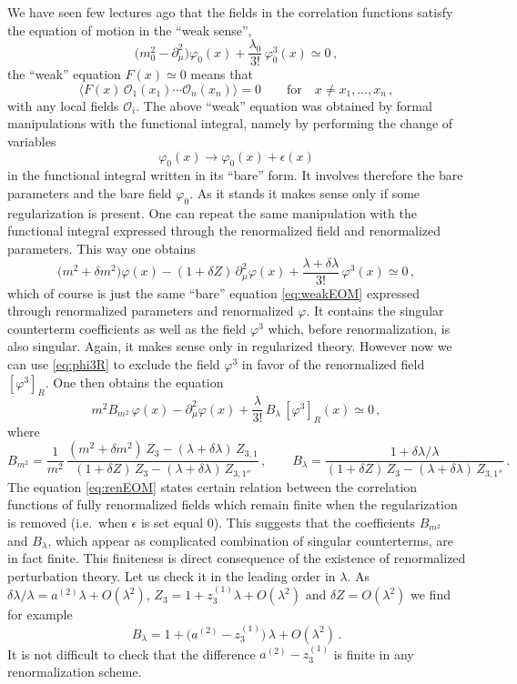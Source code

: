 We have seen few lectures ago that the fields in the correlation functions
satisfy the equation of motion in the ``weak sense'',
\begin{equation}\label{eq:weakEOM}
\bigl(m_0^2-\partial_\mu^2\bigr)\varphi_0(x)+\frac{\lambda_0}{3!}\,\varphi_0^3(x)\simeq0\,,
\end{equation}
the ``weak'' equation $F(x)\simeq0$ means that
\[
\bigl\langle F(x)\,\mathcal O_1(x_1)\cdots\mathcal O_n(x_n)\bigr\rangle=0\qquad\text{for}\quad x\neq x_1,\dots,x_n\,,
\]
with any local fields $\mathcal O_i$. The above ``weak'' equation was obtained by
formal manipulations with the functional integral, namely by performing the
change of variables
\[
\varphi_0(x)\to\varphi_0(x)+\epsilon(x)
\]
in the functional integral written in its ``bare'' form. It involves therefore
the bare parameters and the bare field $\varphi_0$. As it stands it makes sense
only if some regularization is present. One can repeat the same manipulation with
the functional integral expressed through the renormalized field and
renormalized parameters. This way one obtains
\[
\bigl(m^2+\delta m^2\bigr)\varphi(x)-(1+\delta Z)\,\partial_\mu^2\varphi(x)+\frac{\lambda+\delta\lambda}{3!}\,\varphi^3(x)\simeq0\,,
\]
which of course is just the same ``bare'' equation \eqref{eq:weakEOM} expressed
through renormalized parameters and renormalized $\varphi$. It contains the
singular counterterm coefficients as well as the field $\varphi^3$ which, before
renormalization, is also singular. Again, it makes sense only in regularized
theory. However now we can use \eqref{eq:phi3R} to exclude the field $\varphi^3$
in favor of the renormalized field $[\varphi^3]_R$. One then obtains the
equation
\begin{equation}\label{eq:renEOM}
m^2B_{m^2}\,\varphi(x)-\partial_\mu^2\varphi(x)+\frac\lambda{3!}\,B_\lambda\,[\varphi^3]_R(x)\simeq0\,,
\end{equation}
where
\[
B_{m^2}=\frac1{m^2}\,\frac{(m^2+\delta m^2)\,Z_3-(\lambda+\delta\lambda)\,Z_{3,1}}{(1+\delta Z)\,Z_3-(\lambda+\delta\lambda)\,Z_{3,1''}}\,,\qquad
B_\lambda=\frac{1+\delta\lambda/\lambda}{(1+\delta Z)\,Z_3-(\lambda+\delta\lambda)\,Z_{3,1''}}\,.
\]
The equation \eqref{eq:renEOM} states certain relation between the correlation
functions of fully renormalized fields which remain finite when the
regularization is removed (i.e.\ when $\epsilon$ is set equal 0). This suggests
that the coefficients $B_{m^2}$ and $B_\lambda$, which appear as complicated
combination of singular counterterms, are in fact finite. This finiteness is
direct consequence of the existence of renormalized perturbation theory. Let us
check it in the leading order in $\lambda$. As $\delta\lambda/\lambda=a^{(2)}\lambda+O(\lambda^2)$,
$Z_3=1+z_3^{(1)}\lambda+O(\lambda^2)$ and $\delta Z=O(\lambda^2)$ we find for
example
\[
B_\lambda=1+\bigl(a^{(2)}-z^{(1)}_3\bigr)\,\lambda+O(\lambda^2)\,.
\]
It is not difficult to check that the difference $a^{(2)}-z^{(1)}_3$ is finite
in any renormalization scheme.

